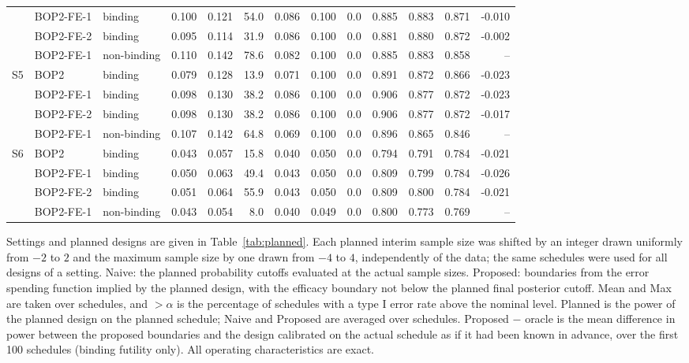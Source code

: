 \begin{table}
\begin{tabular}{lllrrrrrrrrrr}
 & BOP2-FE-1 & binding & 0.100 & 0.121 & 54.0 & 0.086 & 0.100 & 0.0 & 0.885 & 0.883 & 0.871 & -0.010 \\
 & BOP2-FE-2 & binding & 0.095 & 0.114 & 31.9 & 0.086 & 0.100 & 0.0 & 0.881 & 0.880 & 0.872 & -0.002 \\
 & BOP2-FE-1 & non-binding & 0.110 & 0.142 & 78.6 & 0.082 & 0.100 & 0.0 & 0.885 & 0.883 & 0.858 & -- \\
\midrule
S5 & BOP2 & binding & 0.079 & 0.128 & 13.9 & 0.071 & 0.100 & 0.0 & 0.891 & 0.872 & 0.866 & -0.023 \\
 & BOP2-FE-1 & binding & 0.098 & 0.130 & 38.2 & 0.086 & 0.100 & 0.0 & 0.906 & 0.877 & 0.872 & -0.023 \\
 & BOP2-FE-2 & binding & 0.098 & 0.130 & 38.2 & 0.086 & 0.100 & 0.0 & 0.906 & 0.877 & 0.872 & -0.017 \\
 & BOP2-FE-1 & non-binding & 0.107 & 0.142 & 64.8 & 0.069 & 0.100 & 0.0 & 0.896 & 0.865 & 0.846 & -- \\
\midrule
S6 & BOP2 & binding & 0.043 & 0.057 & 15.8 & 0.040 & 0.050 & 0.0 & 0.794 & 0.791 & 0.784 & -0.021 \\
 & BOP2-FE-1 & binding & 0.050 & 0.063 & 49.4 & 0.043 & 0.050 & 0.0 & 0.809 & 0.799 & 0.784 & -0.026 \\
 & BOP2-FE-2 & binding & 0.051 & 0.064 & 55.9 & 0.043 & 0.050 & 0.0 & 0.809 & 0.800 & 0.784 & -0.021 \\
 & BOP2-FE-1 & non-binding & 0.043 & 0.054 & 8.0 & 0.040 & 0.049 & 0.0 & 0.800 & 0.773 & 0.769 & -- \\
\bottomrule
\end{tabular}
\par\medskip
\begin{minipage}{0.95\textwidth}
\footnotesize
Settings and planned designs are given in Table~\ref{tab:planned}. Each planned interim sample size was shifted by an integer drawn uniformly from $-2$ to $2$ and the maximum sample size by one drawn from $-4$ to $4$, independently of the data; the same schedules were used for all designs of a setting. Naive: the planned probability cutoffs evaluated at the actual sample sizes. Proposed: boundaries from the error spending function implied by the planned design, with the efficacy boundary not below the planned final posterior cutoff. Mean and Max are taken over schedules, and $>\alpha$ is the percentage of schedules with a type I error rate above the nominal level. Planned is the power of the planned design on the planned schedule; Naive and Proposed are averaged over schedules. Proposed $-$ oracle is the mean difference in power between the proposed boundaries and the design calibrated on the actual schedule as if it had been known in advance, over the first 100 schedules (binding futility only). All operating characteristics are exact.
\end{minipage}
\end{table}
